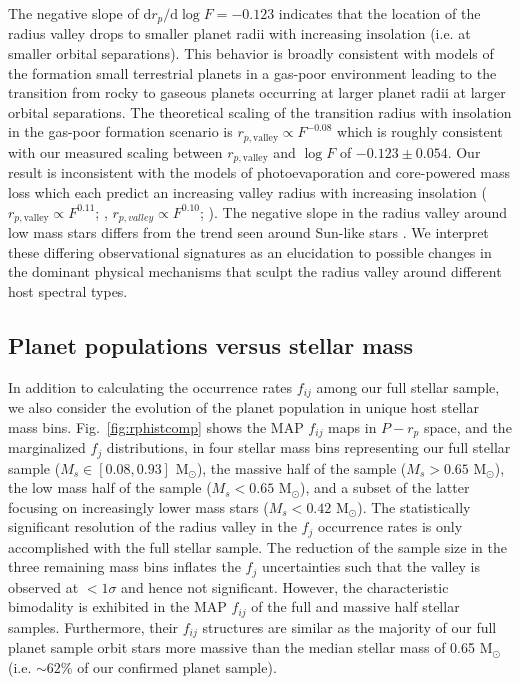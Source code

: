 \documentclass[twocolumn]{emulateapj}
\begin{document}
The negative slope of $\text{d}r_p / \text{d}\log{F} = -0.123$ indicates that the location of the radius valley
drops to smaller planet radii with increasing insolation (i.e. at smaller orbital separations). This behavior
is broadly consistent with models of the formation small terrestrial planets in a gas-poor environment
\citep{lee14,lee16,lopez18} leading to the transition from rocky to gaseous planets occurring at larger planet
radii at larger orbital separations. The theoretical scaling of the transition
radius with insolation in the gas-poor formation scenario is $r_{p,\text{valley}} \propto F^{-0.08}$
\citep{lopez18} which is roughly
consistent with our measured scaling between $r_{p,\text{valley}}$ and $\log{F}$ of $-0.123\pm 0.054$.
Our result is inconsistent with the models of photoevaporation and core-powered mass loss which each predict
an increasing valley radius with increasing insolation ($r_{p,\text{valley}} \propto F^{0.11}$; \citealt{lopez18},  
$r_{p,valley} \propto F^{0.10}$; \citealt{gupta19b}).
The negative slope in the radius valley around low mass stars differs from the trend seen around
Sun-like stars \citep{fulton17,vaneylen18,martinez19}.
We interpret these differing observational signatures as an elucidation to possible changes in the dominant
physical mechanisms that sculpt the radius valley around different host spectral types.

\subsection{Planet populations versus stellar mass} \label{sect:Msbin}
In addition to calculating the occurrence rates $f_{ij}$ among our full stellar sample, we also consider
the evolution of the planet population in unique host stellar mass bins. Fig.~\ref{fig:rphistcomp} shows
the MAP $f_{ij}$ maps in $P-r_p$ space, and the marginalized $f_j$ distributions, in four stellar mass bins
representing our full stellar sample
($M_s \in [0.08,0.93]$ M$_{\odot}$), the massive half of the sample ($M_s>0.65$ M$_{\odot}$),  
the low mass half of the sample ($M_s<0.65$ M$_{\odot}$), and a subset of the latter focusing on
increasingly lower mass stars ($M_s<0.42$ M$_{\odot}$). The statistically significant resolution of the
radius valley in the $f_j$ occurrence rates is only accomplished with the full stellar sample. The reduction
of the sample size in the three remaining mass bins inflates the $f_j$ uncertainties such that the valley
is observed at $<1\sigma$ and hence not significant. However, the characteristic bimodality is exhibited in the
MAP $f_{ij}$ of the full and massive half stellar samples. Furthermore, their $f_{ij}$ structures are similar
as the majority of our full planet sample orbit stars more massive than the median stellar mass of 0.65
M$_{\odot}$ (i.e. $\sim 62$\% of our confirmed planet sample).
\end{document}
